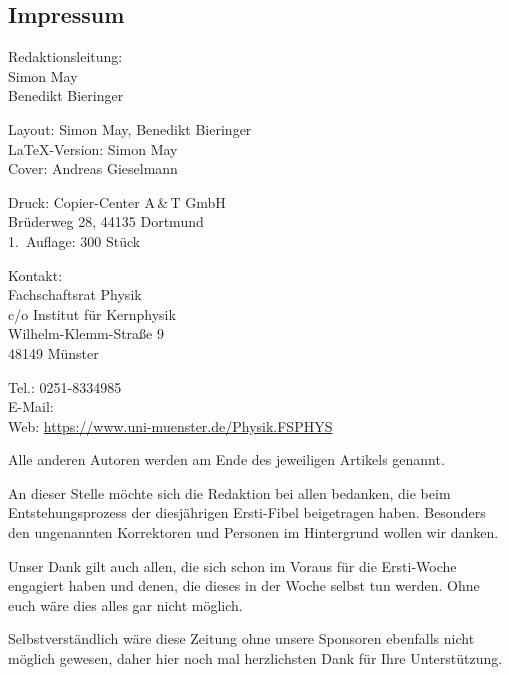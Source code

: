 \begin{multicols*}{2}
\section*{Impressum}
\vspace{-0.5cm}

\begin{center}
{\large
Redaktionsleitung:\\[0.2\baselineskip]
\normalsize
Simon May\\
Benedikt Bieringer}

\footnotesize
Layout: Simon May, Benedikt Bieringer\\
\LaTeX-Version: Simon May\\
Cover: Andreas Gieselmann

Druck: Copier-Center A\,\&\,T GmbH\\
Brüderweg 28, 44135 Dortmund\\
1.~Auflage: 300 Stück

\medskip

{\large Kontakt:\\[0.2\baselineskip]}
Fachschaftsrat Physik\\
c/o Institut für Kernphysik\\
Wilhelm-Klemm-Straße 9\\
48149 Münster

Tel.: 0251-8334985\\
E-Mail: \\
Web: \url{https://www.uni-muenster.de/Physik.FSPHYS}
\end{center}

\footnotesize
Alle anderen Autoren werden am Ende des jeweiligen
Artikels genannt.

An dieser Stelle möchte sich die Redaktion bei allen bedanken, die beim Entstehungsprozess der diesjährigen Ersti-Fibel beigetragen haben. Besonders den ungenannten Korrektoren und Personen im Hintergrund wollen wir danken.

Unser Dank gilt auch allen, die sich schon im Voraus für die Ersti-Woche engagiert haben und denen, die dieses in der Woche selbst tun werden. Ohne euch wäre dies alles gar nicht möglich.

Selbstverständlich wäre diese Zeitung ohne unsere Sponsoren
%
%
ebenfalls nicht möglich gewesen, daher hier noch mal herzlichsten Dank für Ihre Unterstützung.
\end{multicols*}


\clearpage
